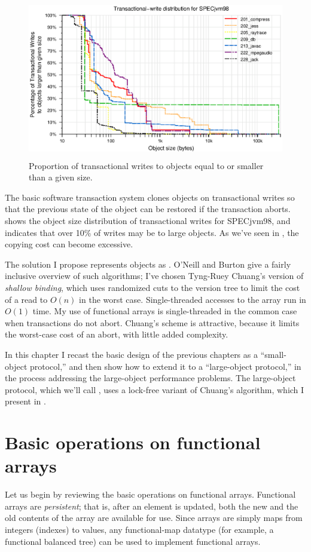 \begin{figure}
\begin{center}
\includegraphics[height=2.75in,clip=true]{Figures/tr-w-all-1}%
\end{center}%
\caption{Proportion of transactional writes to objects equal to or
  smaller than a given size.}
\label{fig:tr-w}%
\end{figure}%
The basic \apex software transaction system clones objects on
transactional writes so that the previous state of the object can be
restored if the transaction aborts.   shows the object
size distribution of transactional writes for SPECjvm98, and
indicates that over 10\% of writes may be to large objects.
As we've seen in , the copying cost can become
excessive.

The solution I propose
represents objects as .  O'Neill and Burton \cite{ONeillBu97} give a fairly
inclusive overview of such algorithms; I've chosen Tyng-Ruey Chuang's
version \cite{Chuang94} of \emph{shallow binding}, which uses
randomized cuts to the version tree to limit the cost of a read to
$O(n)$ in the worst case.  Single-threaded accesses to the array run in
$O(1)$ time.  My use of functional arrays is single-threaded in the common
case when transactions do not abort.  Chuang's scheme is attractive,
because it limits the worst-case cost of an abort, with little
added complexity.

In this chapter I recast the basic \apex design of the previous
chapters as a
``small-object protocol,'' and then show how to extend it to a ``large-object protocol,'' in the process addressing the large-object performance
problems.  The large-object protocol, which we'll call \lapex, uses a
lock-free variant of 
Chuang's algorithm, which I present in .

\section{Basic operations on functional arrays}
Let us begin by reviewing the basic operations on functional arrays.
Functional arrays are \emph{persistent}; that is,
after an element is updated, both the new and the old contents of the
array are available for use.  Since arrays are simply maps from
integers (indexes) to values, any functional-map datatype (for
example, a functional balanced tree) can be used to implement
functional arrays.

